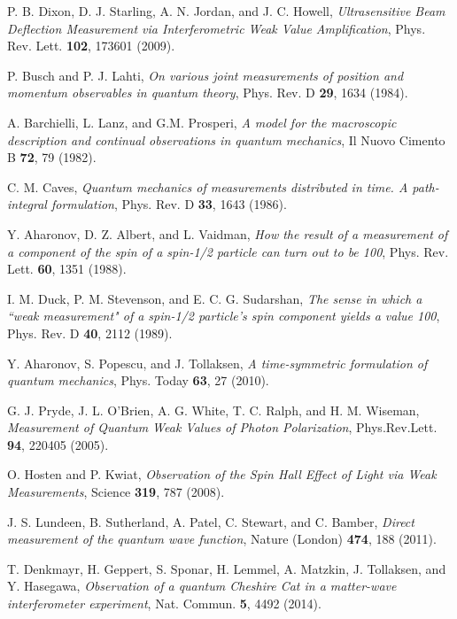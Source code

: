 \documentclass[aps,pra,showpacs,twoside,twocolumn,10pt]{revtex4-1}
\begin{document}
\begin{thebibliography}{100}
 P. B. Dixon, D. J. Starling, A. N. Jordan, and J. C. Howell, \textit{Ultrasensitive Beam Deflection Measurement via Interferometric Weak Value Amplification}, Phys. Rev. Lett. \textbf{102}, 173601 (2009).

 P. Busch and P. J. Lahti, \textit{On various joint measurements of position and momentum observables in quantum theory}, Phys. Rev. D \textbf{29}, 1634 (1984).
 
A. Barchielli, L. Lanz, and G.M. Prosperi,
\textit{A model for the macroscopic description and continual observations in quantum mechanics}, 
Il Nuovo Cimento B \textbf{72}, 79 (1982).

  C. M. Caves, \textit{Quantum mechanics of measurements distributed in time. A path-integral formulation},  Phys. Rev. D \textbf{33}, 1643 (1986).
 
  Y. Aharonov, D. Z. Albert, and L. Vaidman, \textit{How the result of a measurement of a component of the spin of a spin-1/2 particle can turn out to be 100}, Phys. Rev. Lett. \textbf{60}, 1351 (1988).

 I. M. Duck, P. M. Stevenson, and E. C. G. Sudarshan, \textit{The sense in which a ``weak measurement" of a spin-1/2 particle's spin component yields a value 100}, Phys. Rev. D \textbf{40}, 2112 (1989).

 Y. Aharonov, S. Popescu, and J. Tollaksen, \textit{A time-symmetric formulation of quantum mechanics}, Phys. Today \textbf{63}, 27 (2010).

 G. J. Pryde, J. L. O'Brien, A. G. White, T. C. Ralph, and H. M. Wiseman, \textit{Measurement of Quantum Weak Values of Photon Polarization}, Phys.Rev.Lett. \textbf{94}, 220405 (2005). 

 O. Hosten and P. Kwiat, \textit{Observation of the Spin Hall Effect of Light via Weak Measurements}, Science \textbf{319}, 787 (2008).

 J. S. Lundeen, B. Sutherland, A. Patel, C. Stewart, and C. Bamber, \textit{Direct measurement of the quantum wave function}, Nature (London) \textbf{474}, 188 (2011).

 T. Denkmayr, H. Geppert, S. Sponar, H. Lemmel, A. Matzkin, J. Tollaksen, and Y. Hasegawa, \textit{Observation of a quantum Cheshire Cat in a matter-wave interferometer experiment}, Nat. Commun. \textbf{5}, 4492 (2014).


\end{thebibliography}
\end{document}
